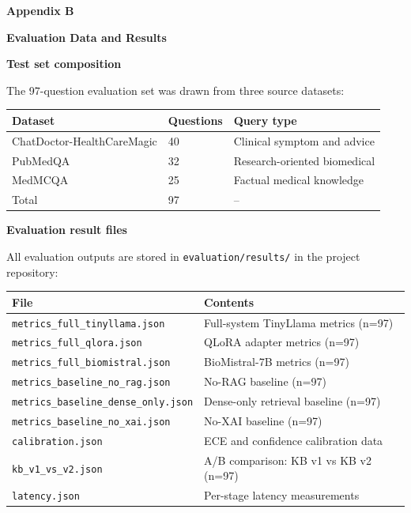 \begin{center}
    {\Large \textbf{Appendix B}} \vspace*{0.5cm}

    {\Large \textbf{Evaluation Data and Results}}
\end{center}

\noindent\textbf{Test set composition}

The 97-question evaluation set was drawn from three source datasets:

\begin{center}
\renewcommand{\arraystretch}{1.3}
\begin{tabular}{|l|l|l|}
\hline
\textbf{Dataset} & \textbf{Questions} & \textbf{Query type} \\
\hline
ChatDoctor-HealthCareMagic & 40 & Clinical symptom and advice \\
PubMedQA & 32 & Research-oriented biomedical \\
MedMCQA & 25 & Factual medical knowledge \\
\hline
Total & 97 & -- \\
\hline
\end{tabular}
\end{center}

\vspace{0.5cm}
\noindent\textbf{Evaluation result files}

All evaluation outputs are stored in \texttt{evaluation/results/} in the project repository:

\begin{center}
\renewcommand{\arraystretch}{1.3}
\begin{tabular}{|l|l|}
\hline
\textbf{File} & \textbf{Contents} \\
\hline
\texttt{metrics\_full\_tinyllama.json} & Full-system TinyLlama metrics (n=97) \\
\texttt{metrics\_full\_qlora.json} & QLoRA adapter metrics (n=97) \\
\texttt{metrics\_full\_biomistral.json} & BioMistral-7B metrics (n=97) \\
\texttt{metrics\_baseline\_no\_rag.json} & No-RAG baseline (n=97) \\
\texttt{metrics\_baseline\_dense\_only.json} & Dense-only retrieval baseline (n=97) \\
\texttt{metrics\_baseline\_no\_xai.json} & No-XAI baseline (n=97) \\
\texttt{calibration.json} & ECE and confidence calibration data \\
\texttt{kb\_v1\_vs\_v2.json} & A/B comparison: KB v1 vs KB v2 (n=97) \\
\texttt{latency.json} & Per-stage latency measurements \\
\hline
\end{tabular}
\end{center}

